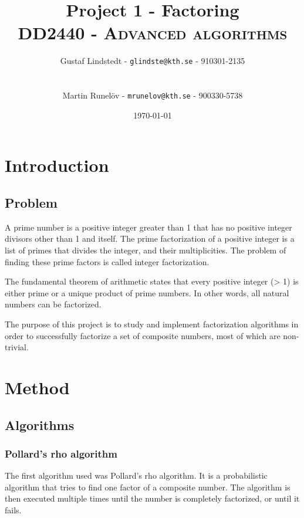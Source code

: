 \documentclass[paper=a4, fontsize=11pt,numbers=endperiod]{scrartcl} %
\title{	
\huge Project 1 - Factoring \\ %
\vspace{10pt}
\normalfont \normalsize 
\textsc{DD2440 - Advanced algorithms } \\ [25pt] %
}
\author{\vspace{-20pt} Gustaf Lindstedt - \nolinkurl{glindste@kth.se} - 910301-2135\\\\\\Martin Runelöv - \nolinkurl{mrunelov@kth.se} - 900330-5738}
\date{\vspace{8pt}\normalsize\today} %
\numberwithin{equation}{section} %
\numberwithin{figure}{section} %
\numberwithin{table}{section} %
\begin{document}
\maketitle %


\section{Introduction}

\subsection{Problem}
A prime number is a positive integer greater than 1 that has no positive integer divisors other than 1 and itself.
The prime factorization of a positive integer is a list of primes that divides the integer, and their multiplicities.
The problem of finding these prime factors is called integer factorization.

The fundamental theorem of arithmetic states that every positive integer (> 1) is either prime or a unique product of prime numbers.
In other words, all natural numbers can be factorized.

The purpose of this project is to study and implement factorization algorithms in order to successfully factorize a set of composite numbers, most of which are non-trivial.



\section{Method}
\subsection{Algorithms}
\subsubsection{Pollard's rho algorithm}
The first algorithm used was Pollard's rho algorithm\cite{pollard}.
It is a probabilistic algorithm that tries to find one factor of a composite number.
The algorithm is then executed multiple times until the number is completely factorized, or until it fails.
\end{document}
